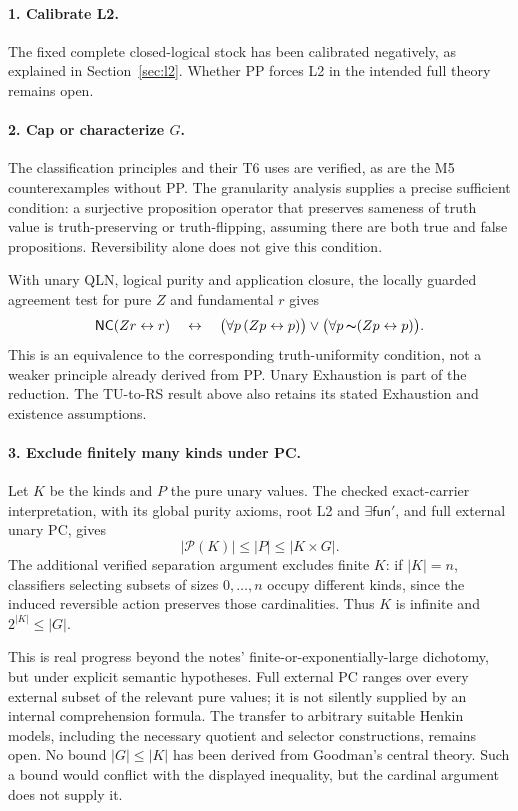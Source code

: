 \documentclass[12pt,leqno]{article}
\newcommand{\OR}{\ensuremath{\vee}}
\newcommand{\IFF}{\ensuremath{\leftrightarrow}}
\newcommand{\NOT}{\ensuremath{\text{$\thicksim$}}}
\newcommand{\funp}{\mathsf{fun}'}
\newcommand{\NC}{\mathsf{NC}}
\newcommand{\Pow}{\mathcal P}
\begin{document}
\paragraph{1. Calibrate L2.}
The fixed complete closed-logical stock has been calibrated negatively,
as explained in Section~\ref{sec:l2}. Whether PP forces L2 in the intended
full theory remains open.

\paragraph{2. Cap or characterize $G$.}
The classification principles and their T6 uses are verified, as are the
M5 counterexamples without PP. The granularity analysis supplies a precise
sufficient condition: a surjective proposition operator that preserves
sameness of truth value is truth-preserving or truth-flipping, assuming
there are both true and false propositions. Reversibility alone does not
give this condition.

With unary QLN, logical purity and application closure, the locally
guarded agreement test for pure $Z$ and fundamental $r$ gives
\[
 \NC(Zr\IFF r)
 \quad\IFF\quad
 \bigl(\forall p\,(Zp\IFF p)\bigr)
 \OR \bigl(\forall p\,\NOT(Zp\IFF p)\bigr).
\]
This is an equivalence to the corresponding truth-uniformity condition,
not a weaker principle already derived from PP. Unary Exhaustion is part
of the reduction. The TU-to-RS result above also retains its stated
Exhaustion and existence assumptions.

\paragraph{3. Exclude finitely many kinds under PC.}
Let $K$ be the kinds and $P$ the pure unary values. The checked exact-carrier
interpretation, with its global purity axioms, root L2 and $\exists\funp$,
and full external unary PC, gives
\[
 |\Pow(K)|\leq |P|\leq |K\times G|.
\]
The additional verified separation argument excludes finite $K$: if
$|K|=n$, classifiers selecting subsets of sizes $0,\ldots,n$ occupy
different kinds, since the induced reversible action preserves those
cardinalities. Thus $K$ is infinite and $2^{|K|}\leq|G|$.

This is real progress beyond the notes' finite-or-exponentially-large
dichotomy, but under explicit semantic hypotheses. Full external PC
ranges over every external subset of the relevant pure values; it is not
silently supplied by an internal comprehension formula. The transfer to
arbitrary suitable Henkin models, including the necessary quotient and
selector constructions, remains open. No bound $|G|\leq|K|$ has been
derived from Goodman's central theory. Such a bound would conflict with
the displayed inequality, but the cardinal argument does not supply it.
\end{document}
